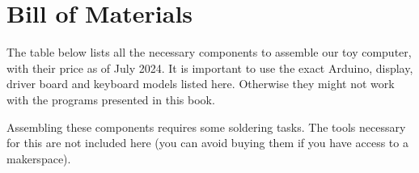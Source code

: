 
\appendix
{}

\chapter{Bill of Materials}\label{appendix:bom}

The table below lists all the necessary components to assemble our toy
computer, with their price as of July 2024. It is important to use the exact
Arduino, display, driver board and keyboard models listed here. Otherwise they
might not work with the programs presented in this book.

Assembling these components requires some soldering tasks. The tools
necessary for this are not included here (you can avoid buying them if you have
access to a makerspace).

